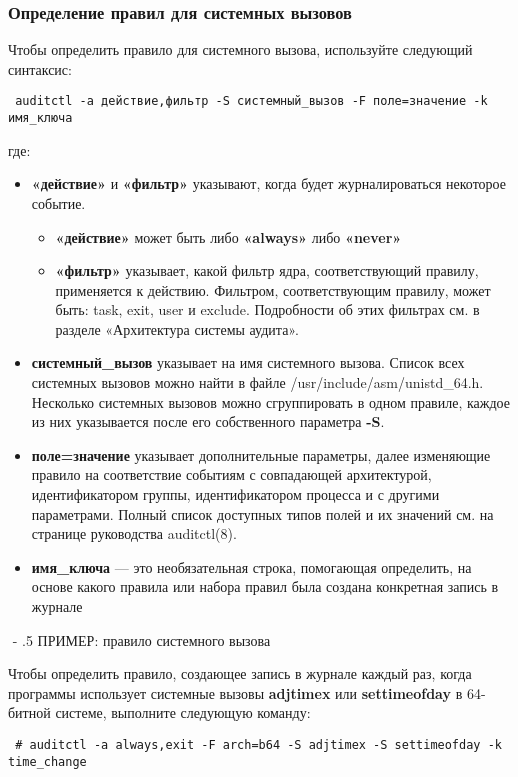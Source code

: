 \documentclass[a4paper,10pt,twoside]{article}
\makeatletter
\renewcommand\paragraph{%
   \@startsection{paragraph}{4}{0mm}%
      {-\baselineskip}%
      {.5\baselineskip}%
      {\normalfont\normalsize\bfseries}}
\makeatother
\begin{document}
\subsubsection{Определение правил для системных вызовов}
Чтобы определить правило для системного вызова, используйте следующий синтаксис:
\begin{verbatim}
 auditctl -a действие,фильтр -S системный_вызов -F поле=значение -k имя_ключа
\end{verbatim} 

где:
\begin{itemize}
 \item \textbf{«действие»} и \textbf{«фильтр»} указывают, когда будет журналироваться некоторое событие.
 \begin{itemize}
  \item \textbf{«действие»} может быть либо \textbf{«always»} либо \textbf{«never»}
\item \textbf{«фильтр»} указывает, какой фильтр ядра, соответствующий правилу, применяется к действию. Фильтром, соответствующим правилу, может быть:
task, exit, user и exclude. Подробности об этих фильтрах см. в разделе «Архитектура системы аудита».
 \end{itemize}
\item \textbf{системный\_вызов} указывает на имя системного вызова. Список всех системных вызовов можно найти в файле /usr/include/asm/unistd\_64.h. Несколько системных вызовов можно сгруппировать в одном правиле, каждое из них указывается после его собственного параметра \textbf{-S}.
\item \textbf{поле=значение} указывает дополнительные параметры, далее изменяющие правило на соответствие событиям с совпадающей архитектурой, идентификатором группы, идентификатором процесса и с другими параметрами. Полный список доступных типов полей и их значений см. на странице руководства auditctl(8).
\item \textbf{имя\_ключа} — это необязательная строка, помогающая определить, на основе какого правила или набора правил была создана конкретная запись в журнале
\end{itemize}


⁠\paragraph{ПРИМЕР: правило системного вызова}

Чтобы определить правило, создающее запись в журнале каждый раз, когда программы использует системные вызовы \textbf{adjtimex} или \textbf{settimeofday} в 64-битной системе, выполните следующую команду:
\begin{verbatim}
 # auditctl -a always,exit -F arch=b64 -S adjtimex -S settimeofday -k time_change
\end{verbatim} 
\end{document}
